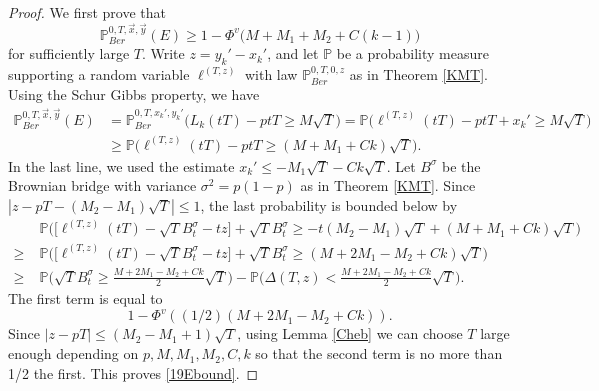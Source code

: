 \begin{proof}
	We first prove that
	\begin{equation}\label{19Ebound}
	\mathbb{P}^{0,T,\vec{x},\vec{y}}_{Ber}(E) \geq 1 - \Phi^v\big(M + M_1 + M_2 + C(k-1)\big)
	\end{equation}
	for sufficiently large $T$. Write $z = y_k' - x_k'$, and let $\mathbb{P}$ be a probability measure supporting a random variable $\ell^{(T,z)}$ with law $\mathbb{P}^{0,T,0,z}_{Ber}$ as in Theorem \ref{KMT}. Using the Schur Gibbs property, we have
	\begin{align*}
	\mathbb{P}^{0,T,\vec{x},\vec{y}}_{Ber}(E)
	&= \mathbb{P}_{Ber}^{0,T, x_k', y_k'} \Big(L_k(tT) - ptT \geq M\sqrt{T}\Big) = \mathbb{P}\Big(\ell^{(T,z)} (tT) - ptT +x_k' \geq M\sqrt{T} \Big)\\
	&\geq \mathbb{P}\Big(\ell^{(T,z)}(tT) - ptT \geq (M + M_1 + Ck)\sqrt{T}\Big).
	\end{align*}
	In the last line, we used the estimate $x_k' \leq -M_1\sqrt{T} - Ck\sqrt{T}$. Let $B^\sigma$ be the Brownian bridge with variance $\sigma^2 = p(1-p)$ as in Theorem \ref{KMT}. Since $|z-pT-(M_2-M_1)\sqrt{T}| \leq 1$, the last probability is bounded below by
	\begin{align*}
	&\mathbb{P} \Big( \Big[ \ell^{(T,z)}(tT)
	-\sqrt{T}B^\sigma_t - tz \Big] + \sqrt{T}B^\sigma_t  
	\geq -t(M_2-M_1)\sqrt{T} + (M+M_1+Ck)\sqrt{T} \Big)\\
	\geq \; & \mathbb{P} \Big( \Big[ \ell^{(T,z)}(tT)
	-\sqrt{T}B^\sigma_t - tz \Big] + \sqrt{T}B^\sigma_t  
	\geq (M+2M_1-M_2+Ck)\sqrt{T} \Big)\\
	\geq \; & \mathbb{P} \Big( \sqrt{T}B^\sigma_t \geq \frac{M+2M_1-M_2+Ck}{2}\sqrt{T} \Big)
	- \mathbb{P} \Big( \Delta(T,z) < \frac{M+2M_1-M_2+Ck}{2}\sqrt{T} \Big).
	\end{align*}
	The first term is equal to 
	$$1 - \Phi^v ((1/2)(M+2M_1-M_2+Ck)).$$ Since $|z-pT|\leq (M_2-M_1+1)\sqrt{T}$, using Lemma \ref{Cheb} we can choose $T$ large enough depending on $p,M,M_1,M_2,C,k$ so that the second term is no more than 1/2 the first. This proves \eqref{19Ebound}.
	

\end{proof}
